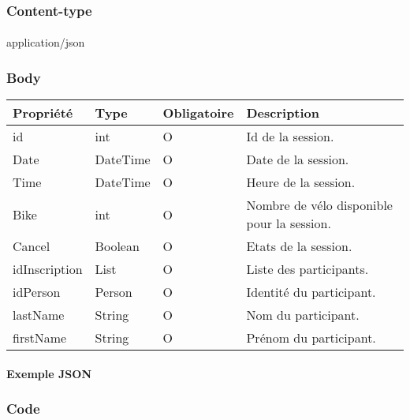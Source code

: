 	\subsubsection{Content-type}
		\paragraph{}
			application/json
	
	\subsubsection{Body}
		\begin{center}
			\begin{tabularx}{\textwidth}{| T{0.2122\textwidth} | S{0.22\textwidth} | S{0.15\textwidth} | S{0.3\textwidth} |}
				\hline
				Propriété & Type & Obligatoire & Description \\
				\hline
				id & int & O & Id de la session. \\
				\hline
				Date & DateTime & O & Date de la session. \\
				\hline
				Time & DateTime & O & Heure de la session. \\
				\hline
				Bike & int & O & Nombre de vélo disponible pour la session. \\
				\hline
				Cancel & Boolean & O & Etats de la session. \\
				\hline
				idInscription & List & O & Liste des participants. \\
				\hline
				idPerson & Person & O & Identité du participant. \\
				\hline
				lastName & String & O & Nom du participant. \\
				\hline
				firstName & String & O & Prénom du participant. \\
				\hline
			\end{tabularx}
		\end{center}
		
	\newpage
		\paragraph{Exemple JSON}
			\paragraph{}
			
			
	\subsubsection{Code}
		\paragraph{}
